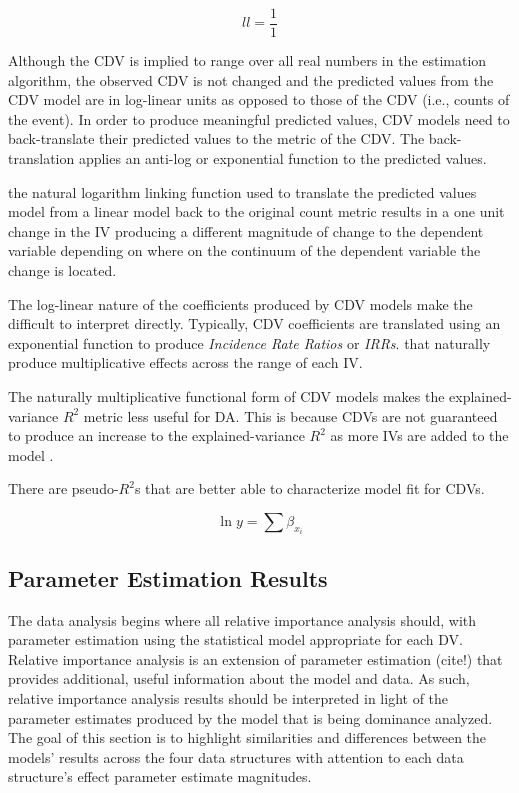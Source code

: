 \documentclass[ShortAfour,times,sageapa]{sagej}
\begin{document}
  	\begin{equation}
  		ll = \frac{1}{1}
  	\end{equation}
  	
  	Although the CDV is implied to range over all real numbers in the estimation algorithm, the observed CDV is not changed and the predicted values from the CDV model are in log-linear units as opposed to those of the CDV (i.e., counts of the event).  	
  	In order to produce meaningful predicted values, CDV models need to back-translate their predicted values to the metric of the CDV.  The back-translation applies an anti-log or exponential function to the predicted values.
  	 
  	the natural logarithm linking function used to translate the predicted values
  	model from a linear model back to the original count metric results in a one unit change in the IV producing a different magnitude of change to the dependent variable depending on where on the continuum of the dependent variable the change is located. 

	The log-linear nature of the coefficients produced by CDV models make the difficult to interpret directly. 
	Typically, CDV coefficients are translated using an exponential function to produce \emph{Incidence Rate Ratios} or \emph{IRRs}.  
	that naturally produce multiplicative effects across the range of each IV.

	The naturally multiplicative functional form of CDV models makes the explained-variance $R^2$ metric less useful for DA.  This is because CDVs are not guaranteed to produce an increase to the explained-variance $R^2$ as more IVs are added to the model \cite{}.  
	
	There are pseudo-$R^2$s that are better able to characterize model fit for CDVs.  
	
	
	\begin{equation}
		\ln{y} = \sum{\beta_{x_i}}
	\end{equation}

	\subsection{Parameter Estimation Results}

The data analysis begins where all relative importance analysis should, with parameter estimation using the statistical model appropriate for each DV.  
Relative importance analysis is an extension of parameter estimation (cite!) that provides additional, useful information about the model and data.  
As such, relative importance analysis results should be interpreted in light of the parameter estimates produced by the model that is being dominance analyzed.  
The goal of this section is to highlight similarities and differences between the models' results across the four data structures with attention to each data structure's effect parameter estimate magnitudes. 
\end{document}
